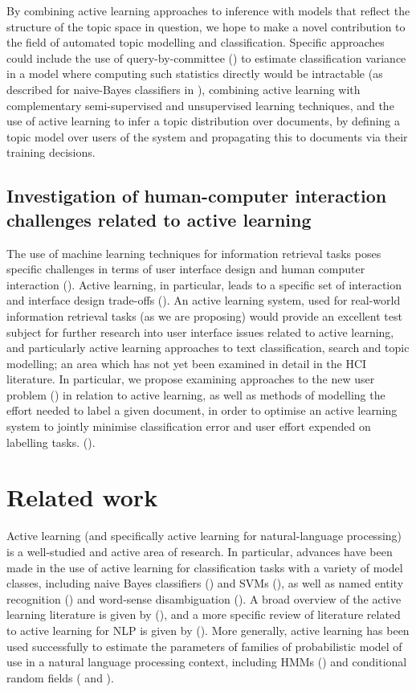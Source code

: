 \documentclass[a4paper, 11pt]{article}
\begin{document}
By combining active learning approaches to inference with models that reflect the structure of the topic space in question, we hope to make a novel contribution to the field of automated topic modelling and classification. Specific approaches could include the use of query-by-committee (\cite{Argamon-Engelson2011a}) to estimate classification variance in a model where computing such statistics directly would be intractable (as described for naive-Bayes classifiers in \cite{McCallum1998}), combining active learning with complementary semi-supervised and unsupervised learning techniques, and the use of active learning to infer a topic distribution over documents, by defining a topic model over users of the system and propagating this to documents via their training decisions.

\subsection{Investigation of human-computer interaction challenges related to active learning}

The use of machine learning techniques for information retrieval tasks poses specific challenges in terms of user interface design and human computer interaction (\cite{Brajnik1990}). Active learning, in particular, leads to a specific set of interaction and interface design trade-offs (\cite{Rubens2011}). An active learning system, used for real-world information retrieval tasks (as we are proposing) would provide an excellent test subject for further research into user interface issues related to active learning, and particularly active learning approaches to text classification, search and topic modelling; an area which has not yet been examined in detail in the HCI literature. In particular, we propose examining approaches to the new user problem (\cite{Rashid2002}) in relation to active learning, as well as methods of modelling the effort needed to label a given document, in order to optimise an active learning system to jointly minimise classification error and user effort expended on labelling tasks. (\cite{Settles2008a}).
\section{Related work}
\label{sec:Related work}

Active learning (and specifically active learning for natural-language processing) is a well-studied and active area of research. In particular, advances have been made in the use of active learning for classification tasks with a variety of model classes, including naive Bayes classifiers (\cite{McCallum1998}) and SVMs (\cite{Tong2002}), as well as named entity recognition (\cite{Olsson2008}) and word-sense disambiguation (\cite{Fujii1998}). A broad overview of the active learning literature is given by (\cite{Settles2010}), and a more specific review of literature related to active learning for NLP is given by (\cite{Olsson2009}). More generally, active learning has been used successfully to estimate the parameters of families of probabilistic model of use in a natural language processing context, including HMMs (\cite{Argamon-Engelson2011a}) and conditional random fields (\cite{Settles2008} and \cite{Olsson2008}).
\end{document}
